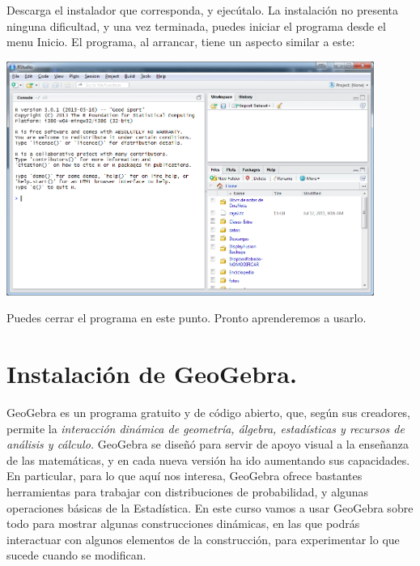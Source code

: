 \documentclass[10pt,a4paper]{article}\usepackage[]{graphicx}\usepackage[]{color}
\newcounter {cont01}
\begin{document}
Descarga el instalador que corresponda, y ejecútalo. La instalación no presenta ninguna dificultad,
y una vez terminada, puedes iniciar el programa desde el menu Inicio. El programa, al arrancar,
tiene un aspecto similar a este:
    \begin{center}
    \includegraphics[width=12cm]{../fig/Tut00-44.png}
    \end{center}
Puedes cerrar el programa en este punto. Pronto aprenderemos a usarlo.


\section{Instalación de GeoGebra.}
\label{tut00:sec:InstalacionGeoGebra}

GeoGebra  es un programa gratuito y de código abierto, que, según sus creadores, permite la {\em
interacción dinámica de geometría, álgebra, estadísticas y recursos de análisis y cálculo.}
GeoGebra  se diseñó para servir de apoyo visual a la enseñanza de las matemáticas, y en cada nueva
versión ha ido aumentando sus capacidades. En particular, para lo que aquí nos interesa,  GeoGebra
ofrece bastantes herramientas para trabajar con distribuciones de probabilidad, y algunas
operaciones básicas de la Estadística. En este curso vamos a usar  GeoGebra  sobre todo para
mostrar algunas construcciones dinámicas, en las que podrás interactuar con algunos elementos de la
construcción, para experimentar lo que sucede cuando se modifican.

\end{document}
